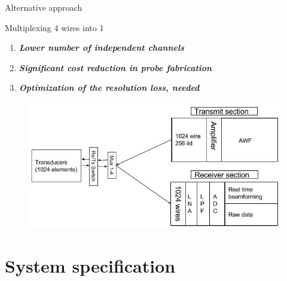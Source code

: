\documentclass[t,12pt,english
\ifx\beamermode\undefined\else,\beamermode\fi
]{beamer}
\begin{document}
\begin{frame}{Alternative approach}


\begin{block}{\footnotesize{Multiplexing 4 wires into 1}}\tiny{}
\begin{enumerate} 
\vspace{0.05cm}
     \item \tiny{\textbf{\textit{Lower number of independent channels}}}
     \item \tiny{\textbf{\textit{Significant cost reduction in probe fabrication}}} 
     \item \tiny{\textbf{\textit{Optimization of the resolution loss, needed}}} 
\end{enumerate}
\end{block}

\begin{figure}[!htb]
\includegraphics[width=.8\textwidth]{40.jpg}
\end{figure}

\end{frame}

\section{System specification}\label{first-section}
\end{document}
